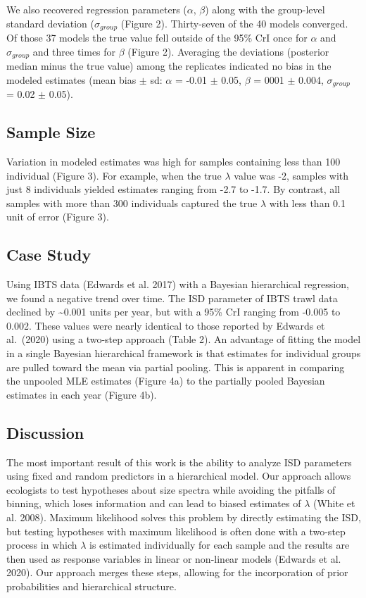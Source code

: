 \documentclass[
  12pt,
]{article}
\begin{document}
We also recovered regression parameters (\(\alpha\), \(\beta\)) along
with the group-level standard deviation (\(\sigma_{group}\) (Figure 2).
Thirty-seven of the 40 models converged. Of those 37 models the true
value fell outside of the 95\% CrI once for \(\alpha\) and
\(\sigma_{group}\) and three times for \(\beta\) (Figure 2). Averaging
the deviations (posterior median minus the true value) among the
replicates indicated no bias in the modeled estimates (mean bias \(\pm\)
sd: \(\alpha\) = -0.01 \(\pm\) 0.05, \(\beta\) = 0001 \(\pm\) 0.004,
\(\sigma_{group}\) = 0.02 \(\pm\) 0.05).

\hypertarget{sample-size-1}{%
\subsection{Sample Size}\label{sample-size-1}}

Variation in modeled estimates was high for samples containing less than
100 individual (Figure 3). For example, when the true \(\lambda\) value
was -2, samples with just 8 individuals yielded estimates ranging from
-2.7 to -1.7. By contrast, all samples with more than 300 individuals
captured the true \(\lambda\) with less than 0.1 unit of error (Figure
3).

\hypertarget{case-study}{%
\subsection{Case Study}\label{case-study}}

Using IBTS data (Edwards et al. 2017) with a Bayesian hierarchical
regression, we found a negative trend over time. The ISD parameter of
IBTS trawl data declined by \textasciitilde0.001 units per year, but
with a 95\% CrI ranging from -0.005 to 0.002. These values were nearly
identical to those reported by Edwards et al.~(2020) using a two-step
approach (Table 2). An advantage of fitting the model in a single
Bayesian hierarchical framework is that estimates for individual groups
are pulled toward the mean via partial pooling. This is apparent in
comparing the unpooled MLE estimates (Figure 4a) to the partially pooled
Bayesian estimates in each year (Figure 4b).

\hypertarget{discussion}{%
\subsection{Discussion}\label{discussion}}

The most important result of this work is the ability to analyze ISD
parameters using fixed and random predictors in a hierarchical model.
Our approach allows ecologists to test hypotheses about size spectra
while avoiding the pitfalls of binning, which loses information and can
lead to biased estimates of \(\lambda\) (White et al. 2008). Maximum
likelihood solves this problem by directly estimating the ISD, but
testing hypotheses with maximum likelihood is often done with a two-step
process in which \(\lambda\) is estimated individually for each sample
and the results are then used as response variables in linear or
non-linear models (Edwards et al. 2020). Our approach merges these
steps, allowing for the incorporation of prior probabilities and
hierarchical structure.
\end{document}
